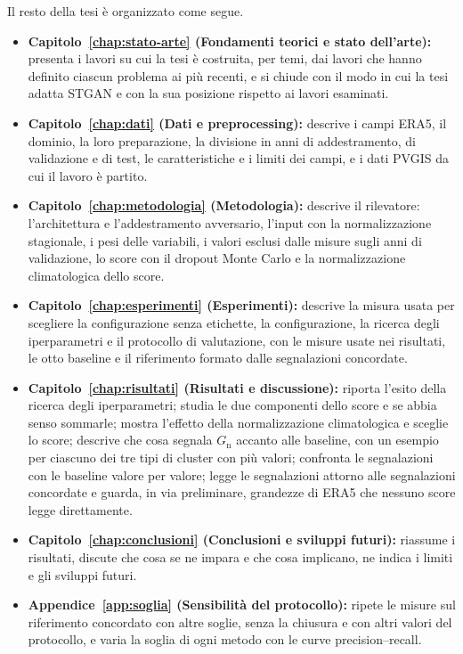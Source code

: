 Il resto della tesi è organizzato come segue.
\begin{itemize}
    \item \textbf{Capitolo~\ref{chap:stato-arte} (Fondamenti teorici e stato dell'arte):} presenta i lavori su cui la tesi è costruita, per temi, dai lavori che hanno definito ciascun problema ai più recenti, e si chiude con il modo in cui la tesi adatta STGAN e con la sua posizione rispetto ai lavori esaminati.
    \item \textbf{Capitolo~\ref{chap:dati} (Dati e preprocessing):} descrive i campi ERA5, il dominio, la loro preparazione, la divisione in anni di addestramento, di validazione e di test, le caratteristiche e i limiti dei campi, e i dati PVGIS da cui il lavoro è partito.
    \item \textbf{Capitolo~\ref{chap:metodologia} (Metodologia):} descrive il rilevatore: l'architettura e l'addestramento avversario, l'input con la normalizzazione stagionale, i pesi delle variabili, i valori esclusi dalle misure sugli anni di validazione, lo score con il dropout Monte Carlo e la normalizzazione climatologica dello score.
    \item \textbf{Capitolo~\ref{chap:esperimenti} (Esperimenti):} descrive la misura usata per scegliere la configurazione senza etichette, la configurazione, la ricerca degli iperparametri e il protocollo di valutazione, con le misure usate nei risultati, le otto baseline e il riferimento formato dalle segnalazioni concordate.
    \item \textbf{Capitolo~\ref{chap:risultati} (Risultati e discussione):} riporta l'esito della ricerca degli iperparametri; studia le due componenti dello score e se abbia senso sommarle; mostra l'effetto della normalizzazione climatologica e sceglie lo score; descrive che cosa segnala $G_{\mathrm{n}}$ accanto alle baseline, con un esempio per ciascuno dei tre tipi di cluster con più valori; confronta le segnalazioni con le baseline valore per valore; legge le segnalazioni attorno alle segnalazioni concordate e guarda, in via preliminare, grandezze di ERA5 che nessuno score legge direttamente.
    \item \textbf{Capitolo~\ref{chap:conclusioni} (Conclusioni e sviluppi futuri):} riassume i risultati, discute che cosa se ne impara e che cosa implicano, ne indica i limiti e gli sviluppi futuri.
    \item \textbf{Appendice~\ref{app:soglia} (Sensibilità del protocollo):} ripete le misure sul riferimento concordato con altre soglie, senza la chiusura e con altri valori del protocollo, e varia la soglia di ogni metodo con le curve precision--recall.

\end{itemize}
